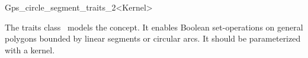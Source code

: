 \ccRefPageBegin

\begin{ccRefClass}{Gps_circle_segment_traits_2<Kernel>}

\ccThreeToTwo

\ccDefinition
The traits class \ccRefName\ models the 
concept. It enables Boolean set-operations on general polygons bounded by
linear segments or circular arcs.
It should be parameterized with a kernel.

 
\ccIsModel
  
\ccSeeAlso
  \\

\end{ccRefClass}
\ccRefPageEnd

